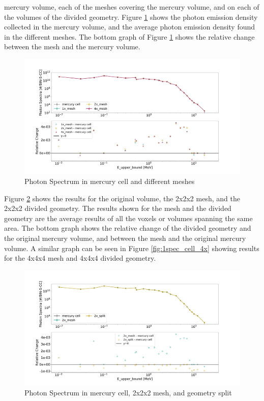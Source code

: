 mercury volume, each of the meshes covering the mercury volume, and on each of
the volumes of the divided geometry.
Figure \ref{fig:1spec_cell_1x_2x_4x} shows the photon emission density
collected in the mercury volume, and the average photon emission density
found in the different meshes. The bottom graph of Figure
\ref{fig:1spec_cell_1x_2x_4x} shows the relative change between the mesh and
the mercury volume.
%
\begin{figure}[H]
 \centering
 \includegraphics[scale=0.42,trim={2cm 0.5cm 3cm 2cm},clip]{../figs/toy_p1/spec_VPI_1x_2x_4x.pdf}
 \caption{Photon Spectrum in mercury cell and different meshes}
 \label{fig:1spec_cell_1x_2x_4x}
\end{figure}
%
Figure \ref{fig:1spec_cell_2x} shows the results for the original volume, the
2x2x2 mesh, and the 2x2x2 divided geometry. The results shown for the mesh and
the divided geometry are the average results of all the voxels or volumes
spanning the same area. The bottom graph shows the relative change of the
divided geometry and the original mercury volume, and between the mesh and the
original mercury volume.
A similar graph can be seen in Figure \ref{fig:1spec_cell_4x} showing results
for the 4x4x4 mesh and 4x4x4 divided geometry.
%
\begin{figure}[H]
 \centering
 \includegraphics[scale=0.42,trim={2cm 0.5cm 3cm 2cm},clip]{../figs/toy_p1/spec_VPI_2x.pdf}
 \caption{Photon Spectrum in mercury cell, 2x2x2 mesh, and geometry split}
 \label{fig:1spec_cell_2x}
\end{figure}
